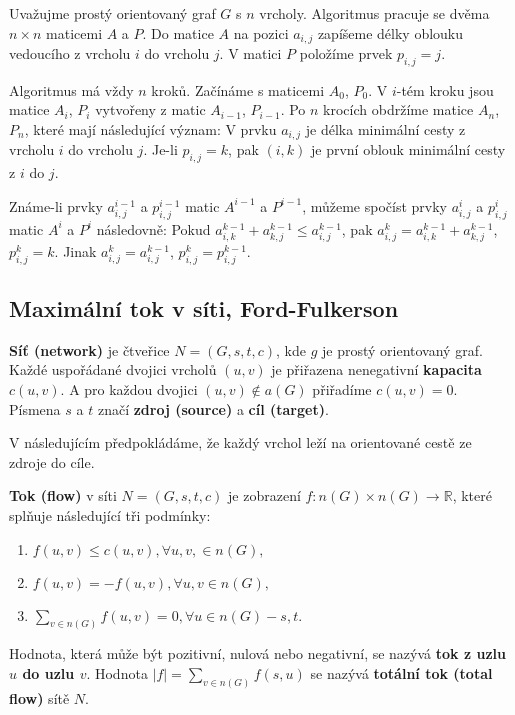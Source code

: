 Uvažujme prostý orientovaný graf $G$ s $n$ vrcholy. Algoritmus pracuje se dvěma $n \times n$
maticemi $A$ a $P$. Do matice $A$ na pozici $a_{i,j}$ zapíšeme délky oblouku vedoucího z vrcholu $i$ do vrcholu $j$. V matici $P$ položíme prvek $p_{i,j} = j$.

Algoritmus má vždy $n$ kroků. Začínáme s maticemi $A_0$, $P_0$. V $i$-tém kroku jsou matice $A_i$, $P_i$ vytvořeny z matic $A_{i-1}$, $P_{i-1}$. Po $n$ krocích obdržíme matice $A_n$, $P_n$, které mají následující význam: V prvku $a_{i,j}$ je délka minimální cesty z vrcholu $i$ do vrcholu $j$. Je-li $p_{i,j} = k$, pak $(i,k)$ je první oblouk minimální cesty z $i$ do $j$.

Známe-li prvky $a^{i-1}_{i,j}$ a $p^{i-1}_{i,j}$ matic $A^{i-1}$ a $P^{i-1}$,
můžeme spočíst prvky $a^{i}_{i,j}$ a $p^{i}_{i,j}$ matic $A^{i}$ a $P^{i}$ následovně: Pokud $a^{k-1}_{i,k}+a^{k-1}_{k,j} \leq a^{k-1}_{i,j}$, pak $a^k_{i,j}=a^{k-1}_{i,k}+a^{k-1}_{k,j}$,  $p^k_{i,j}=k$. Jinak $a^k_{i,j}=a^{k-1}_{i,j}$,  $p^k_{i,j}=p^{k-1}_{i,j}$.

\subsection{Maximální tok v síti, Ford-Fulkerson}

\begin{definition}
\textbf{Síť (network)} je čtveřice $N = (G, s, t, c)$, kde $g$ je prostý orientovaný graf. Každé uspořádané dvojici vrcholů $(u,v)$ je přiřazena nenegativní \textbf{kapacita} $c(u,v)$. A pro každou dvojici $(u,v) \notin a(G)$ přiřadíme $c(u,v) = 0$. Písmena $s$ a $t$ značí \textbf{zdroj (source)} a \textbf{cíl (target)}.
\end{definition}

V následujícím předpokládáme, že každý vrchol leží na orientované cestě ze zdroje do cíle.

\begin{definition}
\textbf{Tok (flow)} v síti $N=(G,s,t,c)$ je zobrazení $f:n(G) \times n(G) \rightarrow \mathbb{R}$, které splňuje následující tři podmínky:
\begin{enumerate}
    \item $f(u,v) \leq c(u,v), \forall u, v, \in n(G),$
    \item $f(u,v) = -f(u,v), \forall u,v \in n(G),$
    \item $\sum_{v \in n(G)} f(u,v) = 0, \forall u \in n(G) - {s,t}.$
\end{enumerate}
Hodnota, která může být pozitivní, nulová nebo negativní, se nazývá \textbf{tok z uzlu $u$ do uzlu $v$}. Hodnota $|f| = \sum_{v \in n(G)} f(s,u)$ se nazývá \textbf{totální tok (total flow)} sítě $N$.
\end{definition}

